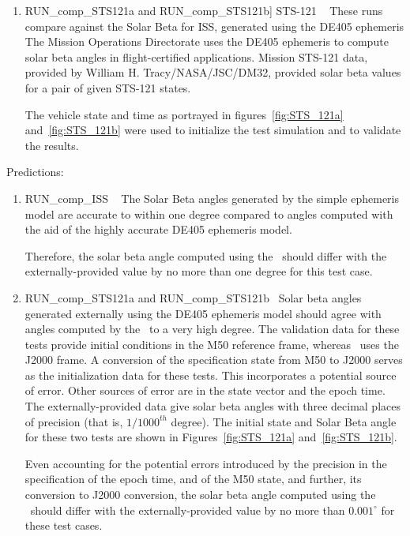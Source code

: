 \begin{description}
\begin{enumerate}
\item{RUN\_comp\_STS121a and RUN\_comp\_STS121b] STS-121} \ \newline
These runs compare against the Solar Beta for ISS, generated using the DE405 ephemeris
The Mission Operations Directorate uses the DE405 ephemeris
to compute solar beta angles in flight-certified applications.
Mission STS-121 data, provided by William H. Tracy/NASA/JSC/DM32,
provided solar beta values for a pair of given STS-121 states.

The vehicle state and time as portrayed in
figures~\ref{fig:STS_121a} and~\ref{fig:STS_121b} were used to initialize
the test simulation and to validate the results.
\end{enumerate}

\item{Predictions:}
\begin{enumerate}
\item{RUN\_comp\_ISS} \ \newline
The Solar Beta angles generated by the
simple ephemeris model are accurate to within one degree compared to
angles computed with the aid of the highly accurate DE405 ephemeris model.

Therefore, the solar beta angle computed using the \SolarBetaDesc\ should differ with
the externally-provided value by no more than one degree
for this test case.

\item{RUN\_comp\_STS121a and RUN\_comp\_STS121b}\ \newline
Solar beta angles generated externally using the DE405 ephemeris model
should agree with angles computed by the \SolarBetaDesc\ to a very high degree.
The validation data for these tests provide initial conditions in the M50 reference frame, whereas \JEODid\ uses the J2000 frame.  A conversion of the specification state from M50 to J2000 serves as the initialization data for these tests.  This incorporates a potential source of error.
Other sources of error are in the state vector and the epoch time.
The externally-provided data give solar beta angles with three
decimal places of precision (that is, $1/1000^{th}$ degree).  The initial state and Solar Beta angle for these two tests are shown in Figures~\ref{fig:STS_121a} and~\ref{fig:STS_121b}.

Even accounting for the potential errors introduced by the precision in the specification of the epoch time, and of the M50 state, and further, its conversion to J2000 conversion, the solar beta angle computed using the \SolarBetaDesc\ should differ with the externally-provided value by no more than $0.001^\circ$ for these test cases.
\end{enumerate}


\end{description}
